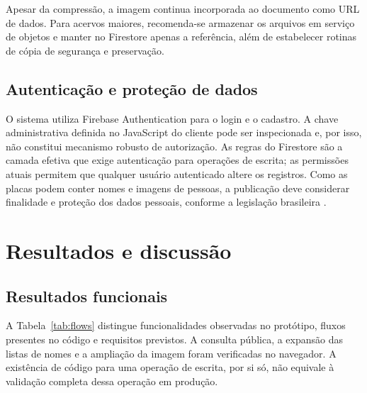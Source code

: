 \documentclass[12pt]{article}
\begin{document}
Apesar da compressão, a imagem continua incorporada ao documento como URL de
dados. Para acervos maiores, recomenda-se armazenar os arquivos em serviço de
objetos e manter no Firestore apenas a referência, além de estabelecer rotinas
de cópia de segurança e preservação.

\subsection{Autenticação e proteção de dados}

O sistema utiliza Firebase Authentication para o login e o cadastro. A chave
administrativa definida no JavaScript do cliente pode ser inspecionada e, por
isso, não constitui mecanismo robusto de autorização. As regras do Firestore
são a camada efetiva que exige autenticação para operações de escrita; as
permissões atuais permitem que qualquer usuário autenticado altere os registros.
Como as placas podem conter nomes e imagens de pessoas, a publicação deve
considerar finalidade e proteção dos dados pessoais, conforme a legislação
brasileira \cite{brasil2018}.

\section{Resultados e discussão}

\subsection{Resultados funcionais}

A Tabela~\ref{tab:flows} distingue funcionalidades observadas no protótipo,
fluxos presentes no código e requisitos previstos. A consulta
pública, a expansão das listas de nomes e a ampliação da imagem foram
verificadas no navegador. A existência de código para uma operação de escrita,
por si só, não equivale à validação completa dessa operação em produção.
\end{document}
